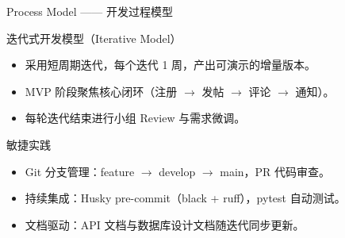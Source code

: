 \documentclass[aspectratio=169,UTF8]{ctexbeamer}
\begin{document}
\begin{frame}{Process Model —— 开发过程模型}
    \begin{block}{迭代式开发模型（Iterative Model）}
        \begin{itemize}
            \item 采用短周期迭代，每个迭代 1 周，产出可演示的增量版本。
            \item MVP 阶段聚焦核心闭环（注册 $\rightarrow$ 发帖 $\rightarrow$ 评论 $\rightarrow$ 通知）。
            \item 每轮迭代结束进行小组 Review 与需求微调。
        \end{itemize}
    \end{block}
    \pause
    \begin{block}{敏捷实践}
        \begin{itemize}
            \item Git 分支管理：feature $\rightarrow$ develop $\rightarrow$ main，PR 代码审查。
            \item 持续集成：Husky pre-commit（black + ruff），pytest 自动测试。
            \item 文档驱动：API 文档与数据库设计文档随迭代同步更新。
        \end{itemize}
    \end{block}
\end{frame}
\end{document}
